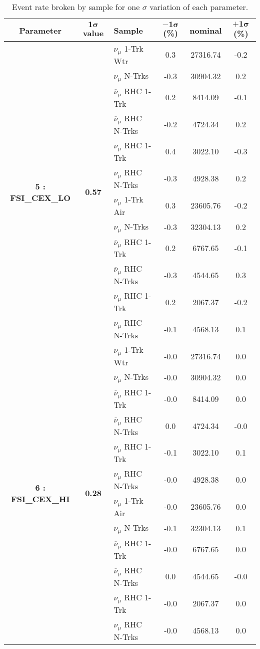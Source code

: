 \addtocounter{table}{-1}
\begin{table}[ht!]
\centering
\begin{tabular}{ c  c  l  c  c  c }
\midrule[1.3pt]
\textbf{Parameter} & \textbf{$\mathbf{1\sigma}$ value} & \textbf{Sample} & \textbf{$\mathbf{-1\sigma}$ (\%)}  &  \textbf{nominal}  &  \textbf{$\mathbf{+1\sigma}$ (\%)} \\
\midrule[1.3pt]
\multirow{12}{*}{\textbf{5 : FSI\_CEX\_LO}} & \multirow{12}{*}{\textbf{0.57}} & $\nu_\mu$ 1-Trk Wtr &   0.3 &  27316.74 &   -0.2 \\ 
 &  & $\nu_\mu$ N-Trks &   -0.3 &  30904.32 &   0.2 \\ 
 &  & $\overline{\nu}_\mu$ RHC 1-Trk &   0.2 &  8414.09 &   -0.1 \\ 
 &  & $\overline{\nu}_\mu$ RHC N-Trks &   -0.2 &  4724.34 &   0.2 \\ 
 &  & $\nu_\mu$ RHC 1-Trk &   0.4 &  3022.10 &   -0.3 \\ 
 &  & $\nu_\mu$ RHC N-Trks &   -0.3 &  4928.38 &   0.2 \\ 
 &  & $\nu_\mu$ 1-Trk Air &   0.3 &  23605.76 &   -0.2 \\ 
 &  & $\nu_\mu$ N-Trks &   -0.3 &  32304.13 &   0.2 \\ 
 &  & $\overline{\nu}_\mu$ RHC 1-Trk &   0.2 &  6767.65 &   -0.1 \\ 
 &  & $\overline{\nu}_\mu$ RHC N-Trks &   -0.3 &  4544.65 &   0.3 \\ 
 &  & $\nu_\mu$ RHC 1-Trk &   0.2 &  2067.37 &   -0.2 \\ 
 &  & $\nu_\mu$ RHC N-Trks &   -0.1 &  4568.13 &   0.1 \\ 
\midrule[1.3pt]
\multirow{12}{*}{\textbf{6 : FSI\_CEX\_HI}} & \multirow{12}{*}{\textbf{0.28}} & $\nu_\mu$ 1-Trk Wtr &   -0.0 &  27316.74 &   0.0 \\ 
 &  & $\nu_\mu$ N-Trks &   -0.0 &  30904.32 &   0.0 \\ 
 &  & $\overline{\nu}_\mu$ RHC 1-Trk &   -0.0 &  8414.09 &   0.0 \\ 
 &  & $\overline{\nu}_\mu$ RHC N-Trks &   0.0 &  4724.34 &   -0.0 \\ 
 &  & $\nu_\mu$ RHC 1-Trk &   -0.1 &  3022.10 &   0.1 \\ 
 &  & $\nu_\mu$ RHC N-Trks &   -0.0 &  4928.38 &   0.0 \\ 
 &  & $\nu_\mu$ 1-Trk Air &   -0.0 &  23605.76 &   0.0 \\ 
 &  & $\nu_\mu$ N-Trks &   -0.1 &  32304.13 &   0.1 \\ 
 &  & $\overline{\nu}_\mu$ RHC 1-Trk &   -0.0 &  6767.65 &   0.0 \\ 
 &  & $\overline{\nu}_\mu$ RHC N-Trks &   0.0 &  4544.65 &   -0.0 \\ 
 &  & $\nu_\mu$ RHC 1-Trk &   -0.0 &  2067.37 &   0.0 \\ 
 &  & $\nu_\mu$ RHC N-Trks &   -0.0 &  4568.13 &   0.0 \\ 
\midrule[1.3pt]
\end{tabular}
\centering
\caption{Event rate broken by sample for one $\sigma$ variation of each parameter.}
\end{table}
